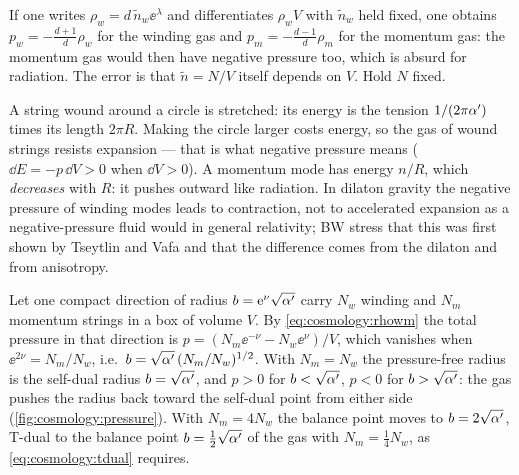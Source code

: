 \begin{pitfallbox}
If one writes $\rho_w=d\,\tilde n_w\ee^{\lambda}$ and differentiates $\rho_wV$ with $\tilde n_w$
held fixed, one obtains $p_w=-\tfrac{d+1}{d}\rho_w$ for the winding gas and
$p_m=-\tfrac{d-1}{d}\rho_m$ for the momentum gas: the momentum gas would then have negative
pressure too, which is absurd for radiation. The error is that $\tilde n=N/V$ itself depends
on $V$. Hold $N$ fixed.
\end{pitfallbox}

\begin{physicsbox}
A string wound around a circle is stretched: its energy is the tension $1/(2\pi\alpha')$
times its length $2\pi R$. Making the circle larger costs energy, so the gas of wound
strings resists expansion --- that is what negative
pressure means ($\dd E=-p\,\dd V>0$ when $\dd V>0$). A momentum mode has energy $n/R$, which \emph{decreases} with $R$: it pushes outward like radiation.
In dilaton gravity the negative pressure of winding modes leads to
contraction, not to accelerated expansion as a negative-pressure fluid would in general
relativity; BW stress that this was first shown by Tseytlin and Vafa and that the
difference comes from the dilaton and from anisotropy. 
\end{physicsbox}

\begin{example}\label{ex:cosmology:balance}
Let one compact direction of radius $b=\mathrm{e}^{\nu}\sqrt{\alpha'}$ carry $N_w$ winding and $N_m$
momentum strings in a box of volume $V$. By \eqref{eq:cosmology:rhowm} the total pressure in
that direction is $p=(N_m\ee^{-\nu}-N_w\ee^{\nu})/V$, which vanishes when
$\ee^{2\nu}=N_m/N_w$, i.e.\ $b=\sqrt{\alpha'}\,(N_m/N_w)^{1/2}$. With $N_m=N_w$ the pressure-free
radius is the self-dual radius $b=\sqrt{\alpha'}$, and $p>0$ for $b<\sqrt{\alpha'}$, $p<0$ for
$b>\sqrt{\alpha'}$: the gas pushes the radius back toward the self-dual point from either side
(\cref{fig:cosmology:pressure}). With $N_m=4N_w$ the balance point moves to $b=2\sqrt{\alpha'}$,
T-dual to the balance point $b=\tfrac12\sqrt{\alpha'}$ of the gas with $N_m=\tfrac14N_w$, as
\eqref{eq:cosmology:tdual} requires.
\end{example}

